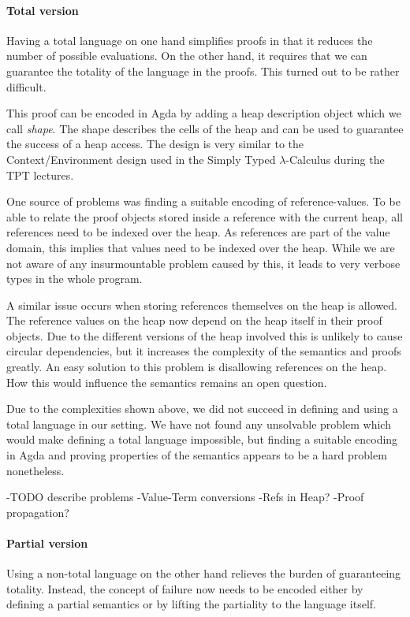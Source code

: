 \documentclass[12pt, a4paper, oneside]{article}
\begin{document}
\paragraph{Total version}
Having a total language on one hand simplifies proofs in that it reduces the number of possible evaluations.
On the other hand, it requires that we can guarantee the totality of the language in the proofs. This turned
out to be rather difficult.

This proof can be encoded in Agda by adding a heap description object which we call \emph{shape}. The shape
describes the cells of the heap and can be used to guarantee the success of a heap access. The design
is very similar to the Context/Environment design used in the Simply Typed $\lambda$-Calculus
during the TPT lectures.

One source of problems was finding a suitable encoding of reference-values. To be able to relate the proof
objects stored inside a reference with the current heap, all references need to be indexed over the heap.
As references are part of the value domain, this implies that values need to be
indexed over the heap. While we are not aware of any insurmountable problem caused by this, it leads
to very verbose types in the whole program.

A similar issue occurs when storing references themselves on the heap is allowed. The reference
values on the heap now depend on the heap itself in their proof objects. Due to the different
versions of the heap involved this is unlikely to cause circular dependencies, but it increases
the complexity of the semantics and proofs greatly.
An easy solution to this problem is disallowing references on the heap. How this would influence
the semantics remains an open question.


Due to the complexities shown above, we did not succeed in defining and using a total
language in our setting. We have not found any unsolvable problem which would make
defining a total language impossible, but finding a suitable encoding in Agda
and proving properties of the semantics appears to be a hard problem nonetheless.


-TODO describe problems
-Value-Term conversions
-Refs in Heap?
-Proof propagation?


\paragraph{Partial version}
Using a non-total language on the other hand relieves the burden of guaranteeing totality.
Instead, the concept of failure now needs to be encoded either by defining a partial semantics
or by lifting the partiality to the language itself.
\end{document}
